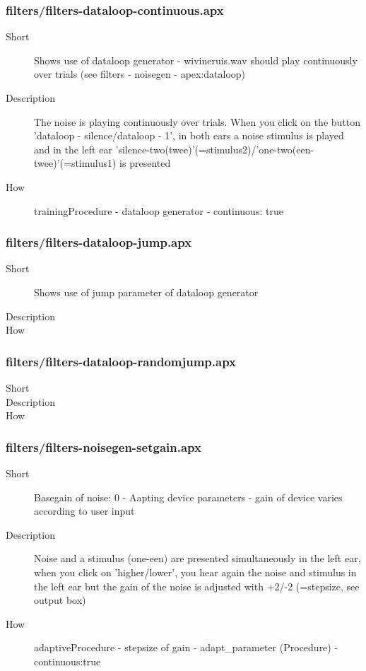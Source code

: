 \subsubsection{filters/filters-dataloop-continuous.apx}
\begin{description}
\item[Short] 
 Shows use of dataloop generator - wivineruis.wav should play continuously over trials (see filters - noisegen - apex:dataloop)
\item[Description] 
 The noise is playing continuously over trials. When you click on the button 'dataloop - silence/dataloop - 1', in both ears a noise stimulus is played and in the left ear 'silence-two(twee)'(=stimulus2)/'one-two(een-twee)'(=stimulus1) is presented
\item[How] 
 trainingProcedure - dataloop generator - continuous: true
\end{description}

\subsubsection{filters/filters-dataloop-jump.apx}
\begin{description}
\item[Short] 
 Shows use of jump parameter of dataloop generator
\item[Description] 

\item[How] 

\end{description}

\subsubsection{filters/filters-dataloop-randomjump.apx}
\begin{description}
\item[Short] 

\item[Description] 

\item[How] 

\end{description}

\subsubsection{filters/filters-noisegen-setgain.apx}
\begin{description}
\item[Short] 
 Basegain of noise: 0 - Aapting device parameters - gain of device varies according to user input
\item[Description] 
 Noise and a stimulus (one-een) are presented simultaneously in the left ear, when you click on 'higher/lower', you hear again the noise and stimulus in the left ear but the gain of the noise is adjusted with +2/-2 (=stepsize, see output box)
\item[How] 
 adaptiveProcedure - stepsize of gain - adapt\_parameter (Procedure) - continuous:true
\end{description}

